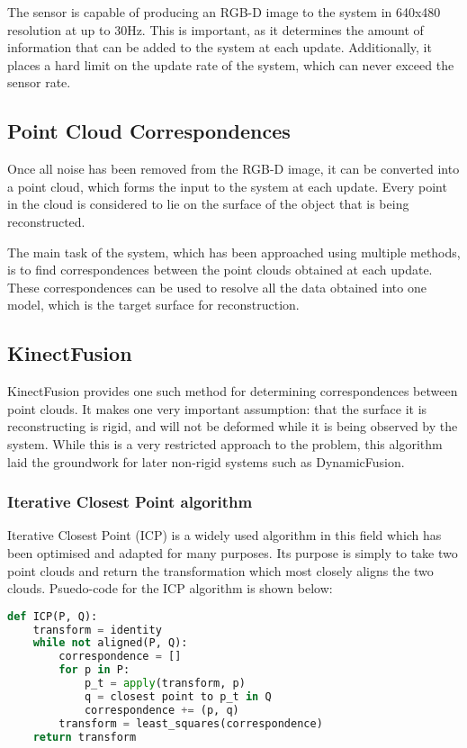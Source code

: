 \documentclass[a4paper]{article}
\begin{document}
The sensor is capable of producing an RGB-D image to the system in 640x480 resolution at up to 30Hz. This is important, as it determines the amount of information that can be added to the system at each update. Additionally, it places a hard limit on the update rate of the system, which can never exceed the sensor rate.

\subsection{Point Cloud Correspondences}

Once all noise has been removed from the RGB-D image, it can be converted into a point cloud, which forms the input to the system at each update. Every point in the cloud is considered to lie on the surface of the object that is being reconstructed. 

The main task of the system, which has been approached using multiple methods, is to find correspondences between the point clouds obtained at each update. These correspondences can be used to resolve all the data obtained into one model, which is the target surface for reconstruction.


\subsection{KinectFusion}

KinectFusion\cite{kinectfusion} provides one such method for determining correspondences between point clouds. It makes one very important assumption: that the surface it is reconstructing is rigid, and will not be deformed while it is being observed by the system. While this is a very restricted approach to the problem, this algorithm laid the groundwork for later non-rigid systems such as DynamicFusion.

\subsubsection{Iterative Closest Point algorithm}
Iterative Closest Point\cite{icp} (ICP) is a widely used algorithm in this field which has been optimised and adapted for many purposes. Its purpose is simply to take two point clouds and return the transformation which most closely aligns the two clouds.
Psuedo-code for the ICP algorithm is shown below:

\begin{lstlisting}[language=Python]
def ICP(P, Q):
    transform = identity
    while not aligned(P, Q):
        correspondence = []
        for p in P:
            p_t = apply(transform, p)
            q = closest point to p_t in Q
            correspondence += (p, q)
        transform = least_squares(correspondence)
    return transform
\end{lstlisting}
\end{document}

